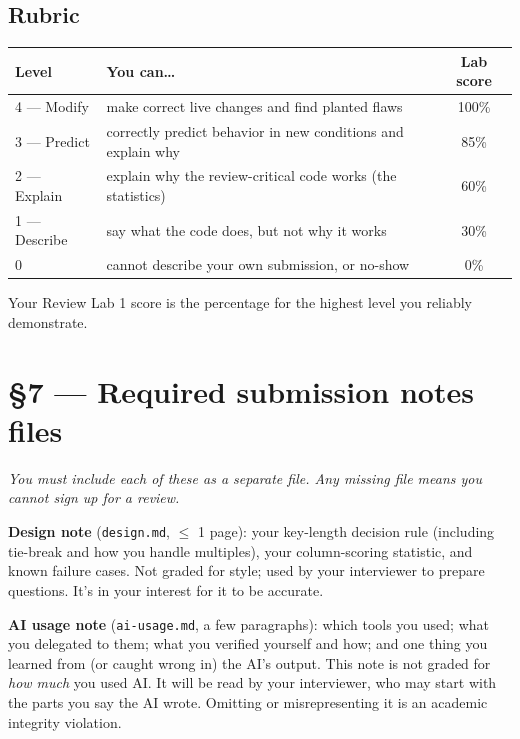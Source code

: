 \documentclass[11pt]{article}
\newcommand{\file}[1]{\texttt{#1}}
\begin{document}
\subsection*{Rubric}
\begin{center}\small
\begin{tabular}{llc}
\toprule
Level & You can\ldots & Lab score \\
\midrule
4 --- Modify & make correct live changes and find planted flaws & 100\% \\
3 --- Predict & correctly predict behavior in new conditions and explain why & 85\% \\
2 --- Explain & explain why the review-critical code works (the statistics) & 60\% \\
1 --- Describe & say what the code does, but not why it works & 30\% \\
0 & cannot describe your own submission, or no-show & 0\% \\
\bottomrule
\end{tabular}
\end{center}
Your Review Lab 1 score is the percentage for the highest level you reliably demonstrate.

\section*{\S7 --- Required submission notes files}
\emph{You must include each of these as a separate file. Any missing file means you cannot sign up for a review.}

\medskip\noindent\textbf{Design note} (\file{design.md}, $\leq$ 1 page): your key-length decision rule (including tie-break and how you handle multiples), your column-scoring statistic, and known failure cases. Not graded for style; used by your interviewer to prepare questions. It's in your interest for it to be accurate.

\medskip\noindent\textbf{AI usage note} (\file{ai-usage.md}, a few paragraphs): which tools you used; what you delegated to them; what you verified yourself and how; and one thing you learned from (or caught wrong in) the AI's output. This note is not graded for \emph{how much} you used AI. It will be read by your interviewer, who may start with the parts you say the AI wrote. Omitting or misrepresenting it is an academic integrity violation. %
\end{document}
